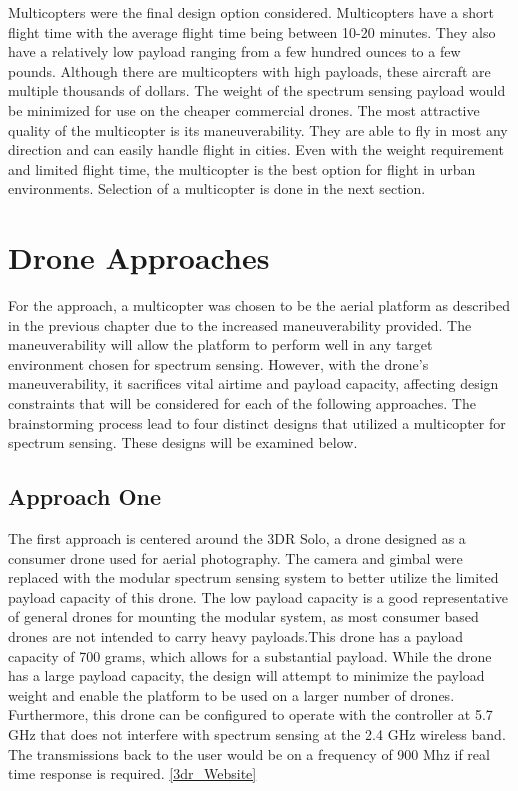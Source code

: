 Multicopters were the final design option considered. Multicopters have a short flight time with the average flight time being between 10-20 minutes. They also have a relatively low payload ranging from a few hundred ounces to a few pounds. Although there are multicopters with high payloads, these aircraft are multiple thousands of dollars. The weight of the spectrum sensing payload would be minimized for use on the cheaper commercial drones. The most attractive quality of the multicopter is its maneuverability. They are able to fly in most any direction and can easily handle flight in cities. Even with the weight requirement and limited flight time, the multicopter is the best option for flight in urban environments. Selection of a multicopter is done in the next section.

\section{Drone Approaches}
For the approach, a multicopter was chosen to be the aerial platform as described in the previous chapter due to the increased maneuverability provided. The maneuverability will allow the platform to perform well in any target environment chosen for spectrum sensing. However, with the drone’s maneuverability, it sacrifices vital airtime and payload capacity, affecting design constraints that will be considered for each of the following approaches. The brainstorming process lead to four distinct designs that utilized a multicopter for spectrum sensing. These designs will be examined below.

\subsection{Approach One}
The first approach is centered around the 3DR Solo, a drone designed as a consumer drone used for aerial photography. The camera and gimbal were replaced with the modular spectrum sensing system to better utilize the limited payload capacity of this drone. The low payload capacity is a good representative of general drones for mounting the modular system, as most consumer based drones are not intended to carry heavy payloads.This drone has a payload capacity of 700 grams, which allows for a substantial payload. While the drone has a large payload capacity, the design will attempt to minimize the payload weight and enable the platform to be used on a larger number of drones. Furthermore, this drone can be configured to operate with the controller at 5.7 GHz that does not interfere with spectrum sensing at the 2.4 GHz wireless band. The transmissions back to the user would be on a frequency of 900 Mhz if real time response is required. \ref{3dr_Website}

